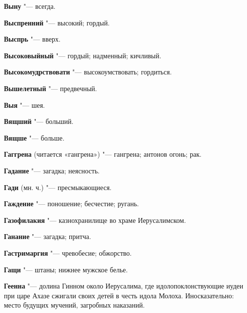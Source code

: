\begin{mymulticols}{2}
\noindent\textbf{Выну} "--- всегда. 




\noindent\textbf{Выспренний} "--- высокий; гордый. 




\noindent\textbf{Выспрь} "--- вверх. 




\noindent\textbf{Высоковыйный} "--- гордый; надменный; кичливый. 




\noindent\textbf{Высокомудрствовати} "--- высокоумствовать; гордиться. 




\noindent\textbf{Вышелетный} "--- предвечный. 




\noindent\textbf{Выя} "--- шея. 




\noindent\textbf{Вящший} "--- больший. 




\noindent\textbf{Вящше} "--- больше. 









\noindent\textbf{Гаггрена} (читается «гангрена») "--- гангрена; антонов огонь; рак. 




\noindent\textbf{Гадание} "--- загадка; неясность. 




\noindent\textbf{Гади} (мн. ч.) "--- пресмыкающиеся. 




\noindent\textbf{Гаждение} "--- поношение; бесчестие; ругань. 




\noindent\textbf{Газофилакия} "--- казнохранилище во храме Иерусалимском. 




\noindent\textbf{Ганание} "--- загадка; притча. 




\noindent\textbf{Гастримаргия} "--- чревобесие; обжорство. 




\noindent\textbf{Гащи} "--- штаны; нижнее мужское белье. 




\noindent\textbf{Геенна} "--- долина Гинном около Иерусалима, где идолопоклонствующие иудеи при царе Ахазе сжигали своих детей в честь идола Молоха. Иносказательно: место будущих мучений, загробных наказаний. 





\end{mymulticols}
